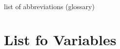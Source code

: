 \documentclass[../thesis.tex]{subfiles}
\begin{document}
\newpage

	
	\listoffigures
	
	\thispagestyle{empty}

\newpage

	
	\listoftables
	
	\thispagestyle{empty}

\newpage


	list of abbreviations (glossary)

	\thispagestyle{empty}
	
\newpage

	
	\section*{List fo Variables}
	
	
	
	\thispagestyle{empty}
\end{document}
